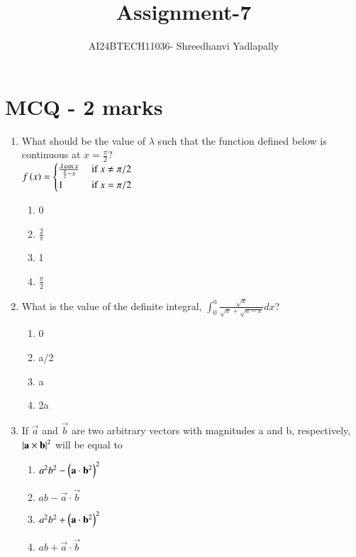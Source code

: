 \documentclass[journal,12pt,onecolumn]{IEEEtran}
\theoremstyle{remark}
\begin{document}

\vspace{3cm}

\title{Assignment-7}
\author{AI24BTECH11036- Shreedhanvi Yadlapally}
\maketitle

\bigskip
\renewcommand{\thefigure}{\theenumi}
\renewcommand{\thetable}{\theenumi}
\section{MCQ - 2 marks}

\begin{enumerate}

\item What should be the value of $\lambda$ such that the function defined below is continuous at $x=\frac{\pi}{2}$?\\
$f\left(x\right)=
\begin{cases}
\frac{\lambda \cos x}{\frac{\pi}{2}-x} & \text{ if } x\neq \pi /2 \\
1 & \text{ if } x=\pi /2 \\
\end{cases}$
	\begin{multicols}{4}
	\begin{enumerate}
		\item 0
		\item $\frac{2}{\pi}$
		\item 1
		\item $\frac{\pi}{2}$
	\end{enumerate}
	\end{multicols}

\item What is the value of the definite integral, $\int_{0}^{a} \frac{\sqrt{x}}{\sqrt{x}+\sqrt{a-x}} dx$?
	\begin{multicols}{4}
	\begin{enumerate}
		\item 0
		\item a/2
		\item a
		\item 2a
	\end{enumerate}
	\end{multicols}

\item If $\vec{a}$ and $\vec{b}$ are two arbitrary vectors with magnitudes a and b, respectively, $\left\vert\mathbf{a} \times \mathbf{b}\right\vert^2$ will be equal to
	\begin{multicols}{4}
	\begin{enumerate}
		\item $a^{2}b^{2}-\left(\mathbf{a} \cdot \mathbf{b}^2\right)^{2}$
		\item $ab-\vec{a} \cdot \vec{b}$
		\item $a^{2}b^{2}+\left(\mathbf{a} \cdot \mathbf{b}^2\right)^{2}$
		\item $ab+\vec{a} \cdot \vec{b}$
	\end{enumerate}
	\end{multicols}


\end{enumerate}
\end{document}
